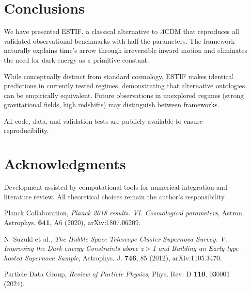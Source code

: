 \documentclass[12pt,a4paper]{article}
\begin{document}
\section{Conclusions}

We have presented ESTIF, a classical alternative to $\Lambda$CDM that reproduces all validated observational benchmarks with half the parameters. The framework naturally explains time's arrow through irreversible inward motion and eliminates the need for dark energy as a primitive constant.

While conceptually distinct from standard cosmology, ESTIF makes identical predictions in currently tested regimes, demonstrating that alternative ontologies can be empirically equivalent. Future observations in unexplored regimes (strong gravitational fields, high redshifts) may distinguish between frameworks.

All code, data, and validation tests are publicly available to ensure reproducibility.

\section*{Acknowledgments}

Development assisted by computational tools for numerical integration and literature review. All theoretical choices remain the author's responsibility.

\begin{thebibliography}{99}

Planck Collaboration,
\textit{Planck 2018 results. VI. Cosmological parameters},
Astron. Astrophys. \textbf{641}, A6 (2020),
arXiv:1807.06209.

N. Suzuki et al.,
\textit{The Hubble Space Telescope Cluster Supernova Survey. V. Improving the Dark-energy Constraints above z$>$1 and Building an Early-type-hosted Supernova Sample},
Astrophys. J. \textbf{746}, 85 (2012),
arXiv:1105.3470.

Particle Data Group,
\textit{Review of Particle Physics},
Phys. Rev. D \textbf{110}, 030001 (2024).

\end{thebibliography}
\end{document}
